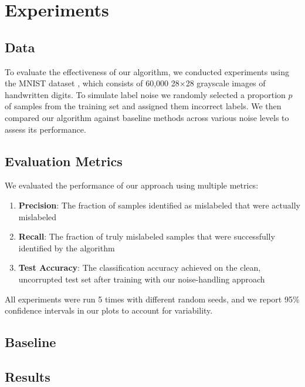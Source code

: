 \documentclass[12pt]{article}
\begin{document}
\section{Experiments}

\subsection{Data}

To evaluate the effectiveness of our algorithm, we conducted experiments using the MNIST dataset \citep{deng2012mnist}, which consists of 60,000 28$\times$28 grayscale images of handwritten digits. To simulate label noise we randomly selected a proportion $p$ of samples from the training set and assigned them incorrect labels. We then compared our algorithm against baseline methods across various noise levels to assess its performance.

\subsection{Evaluation Metrics}

We evaluated the performance of our approach using multiple metrics:

\begin{enumerate}
    \item \textbf{Precision}: The fraction of samples identified as mislabeled that were actually mislabeled
    \item \textbf{Recall}: The fraction of truly mislabeled samples that were successfully identified by the algorithm
    \item \textbf{Test Accuracy}: The classification accuracy achieved on the clean, uncorrupted test set after training with our noise-handling approach
\end{enumerate}

All experiments were run 5 times with different random seeds, and we report 95\% confidence intervals in our plots to account for variability.

\subsection{Baseline}

\subsection{Results}
\end{document}
